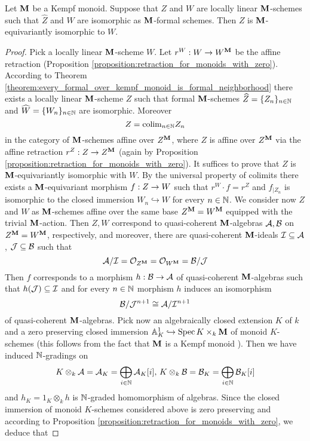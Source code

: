 \begin{theorem}\label{theorem:uniqueness_of_algebraization_for_formal_schemes_over_Kampf_monoid}
Let $\mathbf{M}$ be a Kempf monoid. Suppose that $Z$ and $W$ are locally linear $\mathbf{M}$-schemes such that $\widehat{Z}$ and $ \widehat{W}$ are isomorphic as $\mathbf{M}$-formal schemes. Then $Z$ is $\mathbf{M}$-equivariantly isomorphic to $W$.
\end{theorem}
\begin{proof}
Pick a locally linear $\mathbf{M}$-scheme $W$. Let $r^W:W\rightarrow W^{\mathbf{M}}$ be the affine retraction (Proposition \ref{proposition:retraction_for_monoids_with_zero}). According to Theorem \ref{theorem:every_formal_over_kempf_monoid_is_formal_neighborhood} there exists a locally linear $\mathbf{M}$-scheme $Z$ such that formal $\mathbf{M}$-schemes $\widehat{Z} = \{Z_n\}_{n\in {\mathbb N}}$ and $\widehat{W} = \{W_n\}_{n\in {\mathbb N}}$ are isomorphic. Moreover
$$Z = \mathrm{colim}_{n\in {\mathbb N}}Z_n$$
in the category of $\mathbf{M}$-schemes affine over $Z^{\mathbf{M}}$, where $Z$ is affine over $Z^{\mathbf{M}}$ via the affine retraction $r^Z:Z\rightarrow Z^{\mathbf{M}}$ (again by Proposition \ref{proposition:retraction_for_monoids_with_zero}). It suffices to prove that $Z$ is $\mathbf{M}$-equivariantly isomorphic with $W$. By the universal property of colimits there exists a $\mathbf{M}$-equivariant morphism $f:Z\rightarrow W$ such that $r^W\cdot f = r^Z$ and $f_{\mid Z_n}$ is isomorphic to the closed immersion $W_n\hookrightarrow W$ for every $n\in {\mathbb N}$. We consider now $Z$ and $W$ as $\mathbf{M}$-schemes affine over the same base $Z^{\mathbf{M}} = W^{\mathbf{M}}$ equipped with the trivial $\mathbf{M}$-action. Then $Z,W$ correspond to quasi-coherent $\mathbf{M}$-algebras ${\mathcal A},{\mathcal B}$ on $Z^{\mathbf{M}}=W^{\mathbf{M}}$, respectively, and moreover, there are quasi-coherent $\mathbf{M}$-ideals ${\mathcal I}\subseteq {\mathcal A}$, ${\mathcal J}\subseteq {\mathcal B}$ such that $${\mathcal A}/{\mathcal I} = {\mathcal O}_{Z^{\mathbf{M}}} = {\mathcal O}_{W^{\mathbf{M}}} = {\mathcal B}/{\mathcal J}$$
Then $f$ corresponds to a morphism $h:{\mathcal B}\rightarrow {\mathcal A}$ of quasi-coherent $\mathbf{M}$-algebras such that $h({\mathcal J})\subseteq {\mathcal I}$ and for every $n\in {\mathbb N}$ morphism $h$ induces an isomorphism $${\mathcal B}/{\mathcal J}^{n+1}\cong {\mathcal A}/{\mathcal I}^{n+1}$$
of quasi-coherent $\mathbf{M}$-algebras. Pick now an algebraically closed extension $K$ of $k$ and a zero preserving closed immersion $\mathbb{A}^1_K\hookrightarrow \mathrm{Spec}\, K\times_k\mathbf{M}$ of monoid $K$-schemes (this follows from the fact that $\mathbf{M}$ is a Kempf monoid {\cite[Corollary 3.7]{Algebraic_monoids}}). Then we have induced ${\mathbb N}$-gradings on
$$K\otimes_k{\mathcal A}= {\mathcal A}_K = \bigoplus_{i\in {\mathbb N}}{\mathcal A}_K[i],\,K\otimes_k{\mathcal B} = {\mathcal B}_K =  \bigoplus_{i\in {\mathbb N}}{\mathcal B}_K[i]$$
and $h_K = 1_K \otimes_k h$ is ${\mathbb N}$-graded homomorphism of algebras. Since the closed immersion of monoid $K$-schemes considered above is zero preserving and according to Proposition \ref{proposition:retraction_for_monoids_with_zero}, we deduce that

\end{proof}
